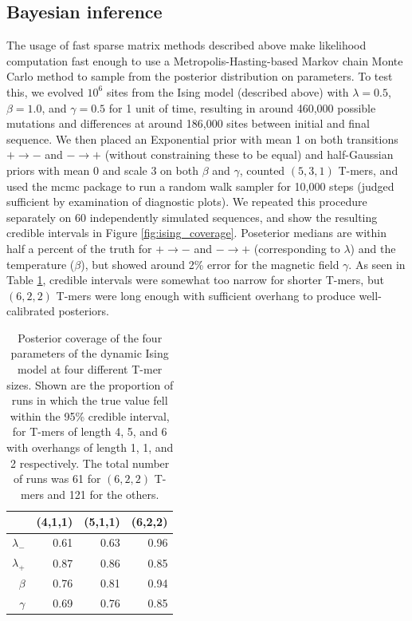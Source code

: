 \documentclass{article}
\theoremstyle{plain}
\theoremstyle{definition}
\begin{document}
\subsection{Bayesian inference}

The usage of fast sparse matrix methods described above make likelihood computation fast enough
to use a Metropolis-Hasting-based Markov chain Monte Carlo method
to sample from the posterior distribution on parameters.
To test this,
we evolved $10^6$ sites from the Ising model (described above) with $\lambda=0.5$, $\beta=1.0$, and $\gamma=0.5$
for 1 unit of time,
resulting in around 460,000 possible mutations
and differences at around 186,000 sites between initial and final sequence.
We then placed an Exponential prior with mean 1 on both transitions $+ \to -$ and $- \to +$
(without constraining these to be equal)
and half-Gaussian priors with mean 0 and scale 3 on both $\beta$ and $\gamma$,
counted $(5,3,1)$ T-mers,
and used the mcmc package \citep{geyer2017mcmc} to run a random walk sampler for 10,000 steps
(judged sufficient by examination of diagnostic plots).
We repeated this procedure separately on 60 independently simulated sequences,
and show the resulting credible intervals in Figure \ref{fig:ising_coverage}.
Poseterior medians are within half a percent of the truth for $+ \to -$ and $- \to +$ (corresponding to $\lambda$)
and the temperature ($\beta$), but showed around 2\% error for the magnetic field $\gamma$.
As seen in Table \ref{tab:ising_coverage},
credible intervals were somewhat too narrow for shorter T-mers,
but $(6,2,2)$ T-mers were long enough with sufficient overhang to produce well-calibrated posteriors.

\begin{table}[ht]
\centering
\begin{tabular}{rrrr}
  \hline
    & (4,1,1) & (5,1,1) & (6,2,2) \\
  \hline
  $\lambda_-$ & 0.61 & 0.63 & 0.96 \\
  $\lambda_+$ & 0.87 & 0.86 & 0.85 \\
  $\beta$     & 0.76 & 0.81 & 0.94 \\
  $\gamma$    & 0.69 & 0.76 & 0.85 \\
   \hline
\end{tabular}
    \caption{
        Posterior coverage of the four parameters of the dynamic Ising model at four different T-mer sizes.
        Shown are the proportion of runs in which the true value fell within the 95\% credible interval,
        for T-mers of length 4, 5, and 6 with overhangs of length 1, 1, and 2 respectively.
        The total number of runs was 61 for $(6,2,2)$ T-mers and 121 for the others.
        \label{tab:ising_coverage}
    }
\end{table}
\end{document}
